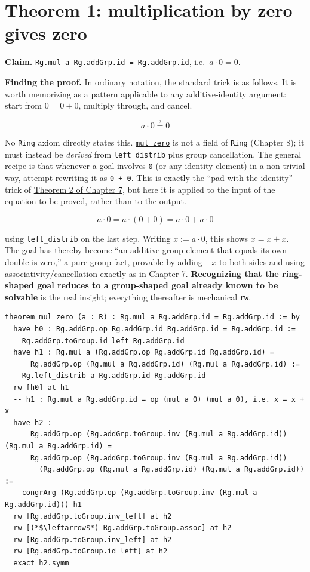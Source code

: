 \section{Theorem 1: multiplication by zero gives zero}\label{sec:09-ring-theorems:02-theorem-1:1}

\textbf{Claim.} \texttt{Rg.mul a Rg.addGrp.id = Rg.addGrp.id}, i.e.~\(a \cdot 0 = 0\).

\textbf{Finding the proof.} In ordinary notation, the standard trick is as follows. It is worth memorizing as a pattern applicable to any additive-identity argument: start from \(0 = 0 + 0\), multiply through, and cancel.

\[
a \cdot 0 \overset{?}{=} 0
\]

No \texttt{Ring} axiom directly states this. \href{https://loogle.lean-lang.org/?q=mul_zero}{\texttt{mul\_\allowbreak{}zero}} is not a field of \texttt{Ring} (Chapter 8); it must instead be \emph{derived} from \texttt{left\_\allowbreak{}distrib} plus group cancellation. The general recipe is that whenever a goal involves \texttt{0} (or any identity element) in a non-trivial way, attempt rewriting it as \texttt{0 + 0}. This is exactly the ``pad with the identity'' trick of \hyperref[sec:07-group-theorems:03-theorem-2:1]{Theorem 2 of Chapter 7}, but here it is applied to the input of the equation to be proved, rather than to the output.

\[
a \cdot 0 = a \cdot (0 + 0) = a\cdot 0 + a \cdot 0
\]

using \texttt{left\_\allowbreak{}distrib} on the last step. Writing \(x := a \cdot 0\), this shows \(x = x + x\). The goal has thereby become ``an additive-group element that equals its own double is zero,'' a pure group fact, provable by adding \(-x\) to both sides and using associativity/cancellation exactly as in Chapter 7. \textbf{Recognizing that the ring-shaped goal reduces to a group-shaped goal already known to be solvable} is the real insight; everything thereafter is mechanical \texttt{rw}.

\begin{lstlisting}
theorem mul_zero (a : R) : Rg.mul a Rg.addGrp.id = Rg.addGrp.id := by
  have h0 : Rg.addGrp.op Rg.addGrp.id Rg.addGrp.id = Rg.addGrp.id :=
    Rg.addGrp.toGroup.id_left Rg.addGrp.id
  have h1 : Rg.mul a (Rg.addGrp.op Rg.addGrp.id Rg.addGrp.id) =
      Rg.addGrp.op (Rg.mul a Rg.addGrp.id) (Rg.mul a Rg.addGrp.id) :=
    Rg.left_distrib a Rg.addGrp.id Rg.addGrp.id
  rw [h0] at h1
  -- h1 : Rg.mul a Rg.addGrp.id = op (mul a 0) (mul a 0), i.e. x = x + x
  have h2 :
      Rg.addGrp.op (Rg.addGrp.toGroup.inv (Rg.mul a Rg.addGrp.id)) (Rg.mul a Rg.addGrp.id) =
      Rg.addGrp.op (Rg.addGrp.toGroup.inv (Rg.mul a Rg.addGrp.id))
        (Rg.addGrp.op (Rg.mul a Rg.addGrp.id) (Rg.mul a Rg.addGrp.id)) :=
    congrArg (Rg.addGrp.op (Rg.addGrp.toGroup.inv (Rg.mul a Rg.addGrp.id))) h1
  rw [Rg.addGrp.toGroup.inv_left] at h2
  rw [(*$\leftarrow$*) Rg.addGrp.toGroup.assoc] at h2
  rw [Rg.addGrp.toGroup.inv_left] at h2
  rw [Rg.addGrp.toGroup.id_left] at h2
  exact h2.symm
\end{lstlisting}

